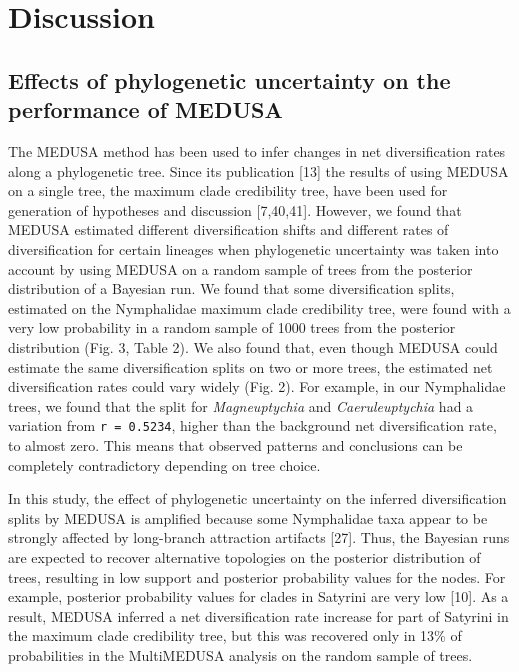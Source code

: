\documentclass[10pt]{article}
\begin{document}
\section*{Discussion}

\subsection*{Effects of phylogenetic uncertainty on the performance of MEDUSA}

The MEDUSA method has been used to infer changes in net diversification
rates along a phylogenetic tree. Since its publication {[}13{]} the
results of using MEDUSA on a single tree, the maximum clade credibility
tree, have been used for generation of hypotheses and discussion
{[}7,40,41{]}. However, we found that MEDUSA estimated different
diversification shifts and different rates of diversification for
certain lineages when phylogenetic uncertainty was taken into account by
using MEDUSA on a random sample of trees from the posterior distribution
of a Bayesian run. We found that some diversification splits, estimated
on the Nymphalidae maximum clade credibility tree, were found with a
very low probability in a random sample of 1000 trees from the posterior
distribution (Fig. 3, Table 2). We also found that, even though MEDUSA
could estimate the same diversification splits on two or more trees, the
estimated net diversification rates could vary widely (Fig. 2). For
example, in our Nymphalidae trees, we found that the split for
\emph{Magneuptychia} and \emph{Caeruleuptychia} had a variation from
\texttt{r = 0.5234}, higher than the background net diversification
rate, to almost zero. This means that observed patterns and conclusions
can be completely contradictory depending on tree choice.

In this study, the effect of phylogenetic uncertainty on the inferred
diversification splits by MEDUSA is amplified because some Nymphalidae
taxa appear to be strongly affected by long-branch attraction artifacts
{[}27{]}. Thus, the Bayesian runs are expected to recover alternative
topologies on the posterior distribution of trees, resulting in low
support and posterior probability values for the nodes. For example,
posterior probability values for clades in Satyrini are very low
{[}10{]}. As a result, MEDUSA inferred a net diversification rate
increase for part of Satyrini in the maximum clade credibility tree, but
this was recovered only in 13\% of probabilities in the MultiMEDUSA
analysis on the random sample of trees.
\end{document}

